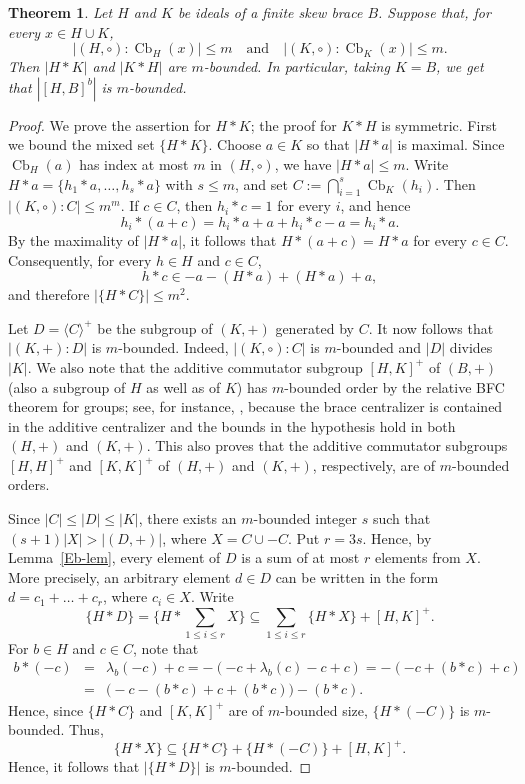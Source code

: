 \documentclass[11pt, oneside]{amsart}
\numberwithin{equation}{section}
\theoremstyle{plain}
\newtheorem{thm}[equation]{Theorem}
\theoremstyle{definition}
\newcommand{\Cb}{\operatorname{Cb} }
\begin{document}
\begin{thm}\label{lem:relative-BFC}
Let $H$ and $K$ be ideals of a finite skew brace $B$. Suppose that, for every $x\in H\cup K$,
\[
|(H,\circ):\Cb_H(x)| \leqslant m \quad\text{and} \quad |(K,\circ):\Cb_K(x)| \leqslant m.
\]
Then $|H*K|$ and $|K*H|$ are $m$-bounded. In particular, taking $K = B$, we get that $|[H, B]^b|$ is $m$-bounded.
\end{thm}
\begin{proof}
We prove the assertion for $H*K$; the proof for $K*H$ is symmetric. First we bound the mixed set $\{H*K\}$. Choose $a\in K$ so that $|H*a|$ is maximal. Since $\Cb_H(a)$ has index at most $m$ in $(H,\circ)$, we have $|H*a|\leqslant m$. Write $H*a=\{h_1*a,\dots,h_s*a\}$ with $s\leqslant m$, and set  $C :=\bigcap_{i=1}^{s}\Cb_K(h_i)$. Then $|(K,\circ):C|\leqslant m^m$. If $c\in C$, then $h_i*c=1$ for every $i$, and hence
\[
h_i*(a+c)=h_i*a+a+h_i*c-a=h_i*a.
\]
By the maximality of $|H*a|$, it follows that $H*(a+c)=H*a$ for every $c\in C$. Consequently, for every $h\in H$ and $c\in C$,
\[
h*c\in -a-(H*a)+(H*a)+a,
\]
and therefore $|\{H*C\}|\leqslant m^2$.

Let $D =\langle C\rangle^+$ be the subgroup of $(K,+)$ generated by $C$. It now follows that $|(K,+):D|$ is $m$-bounded. Indeed, $|(K, \circ):C|$ is $m$-bounded and $|D|$ divides $|K|$.
 We also note that the additive commutator subgroup $[H, K]^+$ of $(B, +)$ (also a subgroup of $H$ as well as of $K$) has $m$-bounded order by the relative BFC theorem for groups; see, for instance, \cite{DS22}, because the brace centralizer is contained in the additive centralizer and the bounds in the hypothesis hold in both $(H,+)$ and $(K,+)$. This also proves that the additive  commutator subgroups $[H, H]^+$ and $[K, K]^+$ of $(H, +)$ and $(K, +)$, respectively, are of $m$-bounded orders.

Since $|C| \leqslant |D| \leqslant |K|$, there exists an $m$-bounded integer $s$ such that $(s+1)|X|>|(D,+)|$, where $X=C\cup-C$. Put $r=3s$. Hence, by Lemma~\ref{Eb-lem}, every element of $D$ is a sum of at most $r$ elements from $X$. More precisely, an arbitrary element  $d\in D$ can be written in the form $d=c_1+\dots+c_r$, where $c_i \in X$. Write 
$$\{H*D\} = \{H*\sum_{1\leqslant i\leqslant r} X \} \subseteq\sum_{1\leqslant i\leqslant r}\{H * X\}+ [H, K]^+.$$ 
 For $b \in H$ and $c \in C$, note that 
 \begin{eqnarray*} 
 b*(-c) &=& \lambda_b(-c) + c = -(-c + \lambda_b(c) -c +c) = -(-c + (b*c) + c)\\
 &=& \big(-c - (b*c) + c + (b*c)\big) - (b*c).
 \end{eqnarray*}
 Hence, since $\{H*C\}$ and $[K, K]^+$ are of $m$-bounded size, $\{H*(-C)\}$ is $m$-bounded. Thus,
 $$\{H*X\} \subseteq \{H*C\} + \{H*(-C)\} + [H, K]^+.$$
 Hence, it follows that  $|\{H*D\}|$ is $m$-bounded.


\end{proof}
\end{document}
